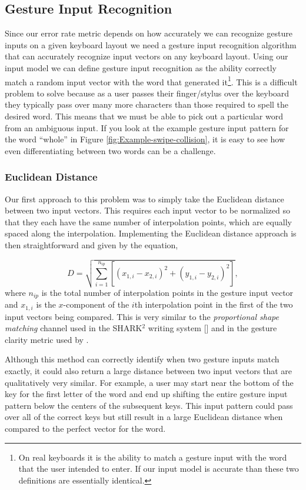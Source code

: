 \documentclass[final,1p,times,authoryear]{elsarticle}
\begin{document}
\subsection{Gesture Input Recognition}\label{sub:Distance-Measure}
Since our error rate metric depends on how accurately we can recognize gesture inputs on a given keyboard layout we need a gesture input recognition algorithm that can accurately recognize input vectors on any keyboard layout.
Using our input model we can define gesture input recognition as the ability correctly match a random input
vector with the word that generated it\footnote{On real keyboards it is the ability to match a gesture input with the word
that the user intended to enter. If our input model is accurate than these two definitions are essentially identical.}.
This is a difficult problem to solve because as a user passes their finger/stylus over the keyboard they typically pass over
many more characters than those required to spell the desired word.
This means that we must be able to pick out a particular word from
an ambiguous input. If you look at the example gesture input pattern for the
word ``whole'' in Figure \ref{fig:Example-swipe-collision}, it
is easy to see how even differentiating between two words can be a
challenge.

\subsubsection{Euclidean Distance}
Our first approach to this problem was to simply take the Euclidean distance between two input vectors. 
This requires each input vector to be normalized so that they each have the same number of interpolation points, which are equally spaced along the interpolation.
Implementing the Euclidean distance approach is then straightforward and given by the equation,

\begin{equation}
D=\sqrt{\sum_{i=1}^{n_{ip}}\left[(x_{1,i}-x_{2,i})^{2}+(y_{1,i}-y_{2,i})^{2}\right]},\label{eq:cartDist}
\end{equation}
where $n_{ip}$ is the total number of interpolation points in the gesture input vector and $x_{1,i}$ is the $x$-component of the $i$th interpolation point in the first of the two input vectors being compared. 
This is very similar to the \textit{proportional shape matching} channel used in the SHARK$^2$ writing system [\cite{SHARK2}] and in the gesture clarity
metric used by \cite{googleKeyboard}. 

Although this method can correctly identify when two gesture inputs match exactly, it could also return a large distance between two input vectors that are qualitatively very similar.
For example, a user may start near the bottom of the key for the first letter of the word and end up shifting the entire gesture input pattern below the centers of the subsequent keys.
This input pattern could pass over all of the correct keys but still result in a large Euclidean distance when compared to the perfect vector for the word. 
\end{document}
